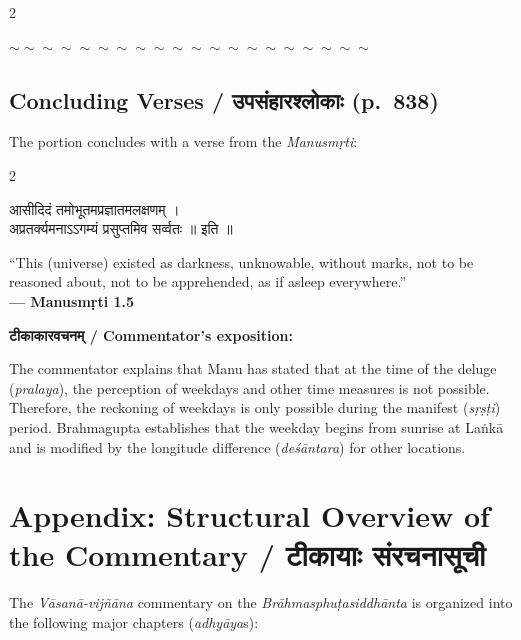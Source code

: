 \documentclass[11pt,a4paper]{article}
\newcommand{\dev}[1]{{\devanagarifont #1}}
\newenvironment{bilingualverse}{%
  \begin{paracol}{2}
  \fontsize{10.5}{13}\selectfont
}{%
  \end{paracol}
  \vspace{0.3cm}
}
\newcommand{\wavydivider}{\begin{center}$\sim\sim\sim\sim\sim\sim\sim\sim\sim\sim\sim\sim\sim\sim\sim\sim\sim\sim\sim\sim$\end{center}}
\begin{document}
\begin{paracol}{2}
\wavydivider

\subsection*{Concluding Verses / \dev{उपसंहारश्लोकाः} (p.\ 838)}

The portion concludes with a verse from the \textit{Manusmṛti}:

\begin{bilingualverse}
\begin{leftcolumn*}
\dev{आसीदिदं तमोभूतमप्रज्ञातमलक्षणम् ।}\\
\dev{अप्रतर्क्यमनाऽऽगम्यं प्रसुप्तमिव सर्व्वतः ॥ इति ॥}
\end{leftcolumn*}
\begin{rightcolumn}
``This (universe) existed as darkness, unknowable, without marks, not to be reasoned about, not to be apprehended, as if asleep everywhere.''\\[0.3cm]
\hfill\textbf{— Manusmṛti 1.5}
\end{rightcolumn}
\end{bilingualverse}

\textbf{\dev{टीकाकारवचनम्} / Commentator's exposition:}

The commentator explains that Manu has stated that at the time of the deluge (\textit{pralaya}), the perception of weekdays and other time measures is not possible. Therefore, the reckoning of weekdays is only possible during the manifest (\textit{sṛṣṭi}) period. Brahmagupta establishes that the weekday begins from sunrise at Laṅkā and is modified by the longitude difference (\textit{deśāntara}) for other locations.

\newpage

\section*{Appendix: Structural Overview of the Commentary / \dev{टीकायाः संरचनासूची}}

The \textit{Vāsanā-vijñāna} commentary on the \textit{Brāhmasphuṭasiddhānta} is organized into the following major chapters (\textit{adhyāya}s):


\end{paracol}
\end{document}
